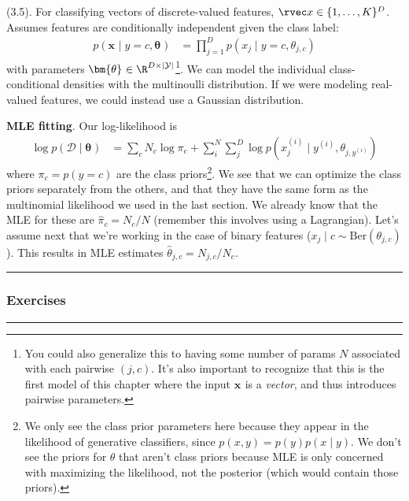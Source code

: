 \documentclass[11pt]{article}
\renewcommand\vec[2][]{\bm{#2}_{#1}}
\newcommand\myspace[1][]{\vspace{#1\bigskipamount}}
\newcommand\p{\Needspace{10\baselineskip} \noindent}
\newcommand\subsub[1]{\Needspace{15\baselineskip}\hrule\subsubsection{#1}\hrule}
\begin{document}
\myspace
\p {} (3.5). For classifying vectors of discrete-valued features, $\rvec x \in \{1, \ldots, K\}^D$. Assumes features are conditionally independent given the class label:
\begin{align}
	p(\vec x \mid y=c, \vec\theta) 
		&= \prod_{j=1}^{D} p(x_j \mid y=c, \theta_{j,c})
\end{align}
with parameters $\vec\theta \in \R^{D \times |\mathcal Y|}$\footnote{You could also generalize this to having some number of params $N$ associated with each pairwise $(j, c)$. It's also important to recognize that this is the first model of this chapter where the input $\vec x$ is a \textit{vector}, and thus introduces pairwise parameters.}. We can model the individual class-conditional densities with the multinoulli distribution. If we were modeling real-valued features, we could instead use a Gaussian distribution.
\begin{compactitem}
	\item \textbf{MLE fitting}. Our log-likelihood is
	\begin{align}
		\log p(\mathcal D \mid \vec\theta)
			&= \sum_{c} N_c \log \pi_c + \sum_i^N \sum_j^D \log p(x^{(i)}_j \mid y^{(i)}, \theta_{j, y^{(i)}})
	\end{align}
	where $\pi_c = p(y=c)$ are the class priors\footnote{We only see the class prior parameters here because they appear in the likelihood of generative classifiers, since $p(x, y) = p(y) p(x \mid y)$. We don't see the priors for $\theta$ that aren't class priors because MLE is only concerned with maximizing the likelihood, not the posterior (which would contain those priors).}. We see that we can optimize the class priors separately from the others, and that they have the same form as the multinomial likelihood we used in the last section. We already know that the MLE for these are $\hat{\pi}_c = N_c / N$ (remember this involves using a Lagrangian). Let's assume next that we're working in the case of binary features ($x_j\mid c \sim \text{Ber}(\theta_{j,c})$). This results in MLE estimates $\hat{\theta}_{j,c} = N_{j,c}/N_c$. 
\end{compactitem}


\clearpage
\subsub{Exercises}
\end{document}
